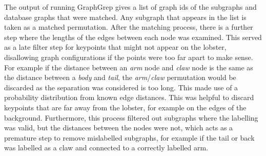 The output of running GraphGrep gives a list of graph ids of the subgraphs and database graphs that were matched. Any subgraph that appears in the list is taken as a matched permutation. After the matching process, there is a further step where the lengths of the edges between each node was examined. This served as a late filter step for keypoints that might not appear on the lobster, disallowing graph configurations if the points were too far apart to make sense. For example if the distance between an \textit{arm} node and \textit{claw} node is the same as the distance between a \textit{body} and \textit{tail}, the \textit{arm}/\textit{claw} permutation would be discarded as the separation was considered is too long. This made use of a probability distribution from known edge distances. This was helpful to discard keypoints that are far away from the lobster, for example on the edges of the background. Furthermore, this process filtered out subgraphs where the labelling was valid, but the distances between the nodes were not, which acts as a premature step to remove mislabelled subgraphs, for example if the tail or back was labelled as a claw and connected to a correctly labelled arm. 

